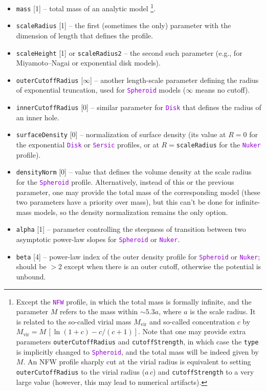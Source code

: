 \documentclass[12pt]{article}
\newcommand{\ttt}[1]{\textcolor{darkviolet}{\texttt{#1}}}
\newcommand{\ppp}[1]{\textcolor{darkolive} {\texttt{#1}}}
\begin{document}
\begin{itemize}
\item \ppp{mass} [1] -- total mass of an analytic model%
\footnote{Except the \ttt{NFW} profile, in which the total mass is formally infinite, and the parameter $M$ refers to the mass within $\sim 5.3a$, where $a$ is the scale radius. It is related to the so-called virial mass $M_\mathrm{vir}$ and so-called concentration $c$ by $M_\mathrm{vir}=M\,[\ln(1+c)-c/(c+1)]$. Note that one may provide extra parameters \ppp{outerCutoffRadius} and \ppp{cutoffStrength}, in which case the \ppp{type} is implicitly changed to \ttt{Spheroid}, and the total mass will be indeed given by $M$. An NFW profile sharply cut at the virial radius is equivalent to setting \ppp{outerCutoffRadius} to the virial radius ($a\,c$) and \ppp{cutoffStrength} to a very large value (however, this may lead to numerical artifacts).}.
\item \ppp{scaleRadius} [1] -- the first (sometimes the only) parameter with the dimension of length that defines the profile.
\item \ppp{scaleHeight} [1] or \ppp{scaleRadius2} -- the second such parameter (e.g., for Miyamoto--Nagai or exponential disk models).
\item \ppp{outerCutoffRadius} [$\infty$] -- another length-scale parameter defining the radius of exponential truncation, used for \ttt{Spheroid} models ($\infty$ means no cutoff).
\item \ppp{innerCutoffRadius} [0] -- similar parameter for \ttt{Disk} that defines the radius of an inner hole.
\item \ppp{surfaceDensity} [0] -- normalization of surface density (its value at $R=0$ for the exponential \ttt{Disk} or \ttt{Sersic} profiles, or at $R=$\ppp{scaleRadius} for the \ttt{Nuker} profile).
\item \ppp{densityNorm} [0] -- value that defines the volume density at the scale radius for the \ttt{Spheroid} profile. Alternatively, instead of this or the previous parameter, one may provide the total mass of the corresponding model (these two parameters have a priority over mass), but this can't be done for infinite-mass models, so the density normalization remains the only option.
\item \ppp{alpha} [1] -- parameter controlling the steepness of transition between two asymptotic power-law slopes for \ttt{Spheroid} or \ttt{Nuker}.
\item \ppp{beta} [4] -- power-law index of the outer density profile for \ttt{Spheroid} or \ttt{Nuker}; should be $>2$ except when there is an outer cutoff, otherwise the potential is unbound.

\end{itemize}
\end{document}
